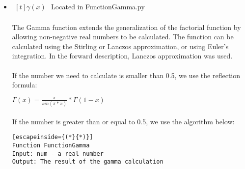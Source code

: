 \begin{itemize}
\begin{lstlisting}[escapeinside={(*}{*)}]
sum (*$\leftarrow$*) 0
for every num in range of 1 to MAX_TERMS do:
    y (*$\leftarrow$*) (x - 1) / (x + 1)
    add (*$\leftarrow$*) FunctionExponent.FunctionExponent(y, (2*n-1)).calculateEquation()/(2*n-1)
    sum (*$\leftarrow$*) sum + add
od
return 2 * sum

Function FunctionLog
Input: base (real number) and value (real number)
Output: Calculated log function

if value > 0 and base > 1 then:
    result (*$\leftarrow$*) ln(value) / ln(base)
    return result
end if
            \end{lstlisting}

        \item $\begin{aligned}[t]
            \gamma(x)
        \end{aligned}$
            Located in FunctionGamma.py

            \paragraph{}
            The Gamma function extends the generalization of the factorial function by allowing non-negative real numbers to be calculated. The function can be calculated using the Stirling or Lanczos approximation, or using Euler's integration. In the forward description, Lanczos approximation was used.

            \paragraph{}
            If the number we need to calculate is smaller than 0.5, we use the reflection formula:

            \begin{center}
                $\Gamma(x) = \frac{\pi}{sin(\pi*x)}*\Gamma(1-x)$
            \end{center}

            \paragraph{}
            If the number is greater than or equal to 0.5, we use the algorithm below:

            \begin{lstlisting}[escapeinside={(*}{*)}]
Function FunctionGamma
Input: num - a real number
Output: The result of the gamma calculation


\end{lstlisting}
\end{itemize}
